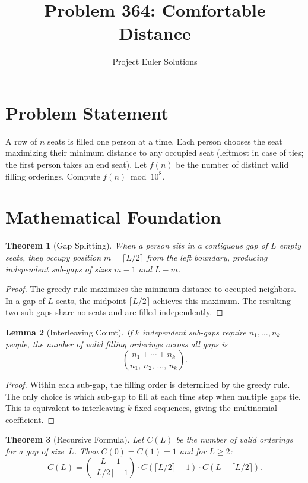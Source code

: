 \documentclass[11pt]{article}
\title{Problem 364: Comfortable Distance}
\author{Project Euler Solutions}
\date{}
\newtheorem{theorem}{Theorem}
\newtheorem{lemma}[theorem]{Lemma}
\begin{document}
\maketitle

\section{Problem Statement}

A row of $n$ seats is filled one person at a time. Each person chooses the seat maximizing their minimum distance to any occupied seat (leftmost in case of ties; the first person takes an end seat). Let $f(n)$ be the number of distinct valid filling orderings. Compute $f(n) \bmod 10^8$.

\section{Mathematical Foundation}

\begin{theorem}[Gap Splitting]
When a person sits in a contiguous gap of $L$ empty seats, they occupy position $m = \lceil L/2 \rceil$ from the left boundary, producing independent sub-gaps of sizes $m-1$ and $L-m$.
\end{theorem}

\begin{proof}
The greedy rule maximizes the minimum distance to occupied neighbors. In a gap of $L$ seats, the midpoint $\lceil L/2 \rceil$ achieves this maximum. The resulting two sub-gaps share no seats and are filled independently.
\end{proof}

\begin{lemma}[Interleaving Count]
If $k$ independent sub-gaps require $n_1, \ldots, n_k$ people, the number of valid filling orderings across all gaps is
\[
\binom{n_1 + \cdots + n_k}{n_1,\, n_2,\, \ldots,\, n_k}.
\]
\end{lemma}

\begin{proof}
Within each sub-gap, the filling order is determined by the greedy rule. The only choice is which sub-gap to fill at each time step when multiple gaps tie. This is equivalent to interleaving $k$ fixed sequences, giving the multinomial coefficient.
\end{proof}

\begin{theorem}[Recursive Formula]
Let $C(L)$ be the number of valid orderings for a gap of size~$L$. Then $C(0) = C(1) = 1$ and for $L \ge 2$:
\[
C(L) = \binom{L-1}{\lceil L/2 \rceil - 1} \cdot C\!\left(\lceil L/2 \rceil - 1\right) \cdot C\!\left(L - \lceil L/2 \rceil\right).
\]
\end{theorem}
\end{document}
